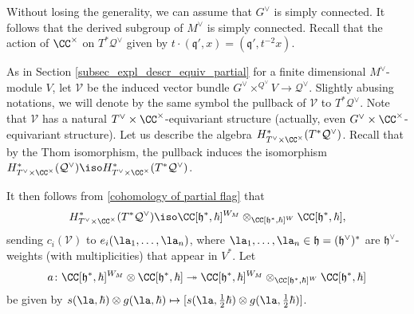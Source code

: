 \documentclass[12pt]{amsart}
\newcommand{\CO}{\mathcal{O}}
\begin{document}
Without losing the generality, we can assume that $G^\vee$ is simply connected. It follows that the derived subgroup of $M^\vee$ is simply connected. Recall that the action of $\CC^\times$ on $T^*\mathcal{Q}^\vee$ given by $t \cdot (\mathfrak{q}',x)=(\mathfrak{q}',t^{-2}x)$. 


As in Section \ref{subsec_expl_descr_equiv_partial} for a finite dimensional $M^\vee$-module $V$, let $\mathcal{V}$ be the induced vector bundle $G^\vee \times^{Q^\vee} V \rightarrow \mathcal{Q}^{\vee}$. Slightly abusing notations, we will denote by the same symbol the pullback of $\mathcal{V}$ to $T^*\mathcal{Q}^\vee$.
Note that $\mathcal{V}$ has a natural $T^\vee \times \CC^\times$-equivariant structure (actually, even $G^\vee \times \CC^\times$-equivariant structure). 
Let us describe the algebra $H^*_{T^\vee \times \CC^\times}(T^*\mathcal{Q}^\vee)$. Recall that by the Thom isomorphism, the pullback induces the isomorphism $H^*_{T^\vee \times \CC^\times}(\mathcal{Q}^\vee) \iso H^*_{T^\vee \times \CC^\times}(T^*\mathcal{Q}^\vee)$. 


It then follows from  \cref{cohomology of partial flag} that 
\begin{equation}\label{ident_cohom_parab_pol_alg}
H^*_{T^\vee \times \CC^\times}(T^*\mathcal{Q}^\vee) \iso  \CC[\mathfrak{h}^*,\hbar]^{W_M} \otimes_{\CC[\mathfrak{h}^*,\hbar]^W} \CC[\mathfrak{h}^*,\hbar], 
\end{equation}
sending $c_i(\mathcal{V})$ to $e_i(\la_1,\ldots,\la_n)$, where $\la_1,\ldots,\la_n \in \mathfrak{h}=(\mathfrak{h}^\vee)^*$ are $\mathfrak{h}^\vee$-weights (with multiplicities) that appear in $V^*$. Let 
\begin{equation*}
a\colon \CC[\mathfrak{h}^*,\hbar]^{W_M} \otimes \CC[\mathfrak{h}^*,\hbar] \twoheadrightarrow \CC[\mathfrak{h}^*,\hbar]^{W_M} \otimes_{\CC[\mathfrak{h}^*,\hbar]^W} \CC[\mathfrak{h}^*,\hbar]
\end{equation*}
be given by $s(\la,\hbar) \otimes g(\la,\hbar) \mapsto [s(\la,\frac{1}{2}\hbar) \otimes g(\la,\frac{1}{2}\hbar)]$. 
\end{document}
